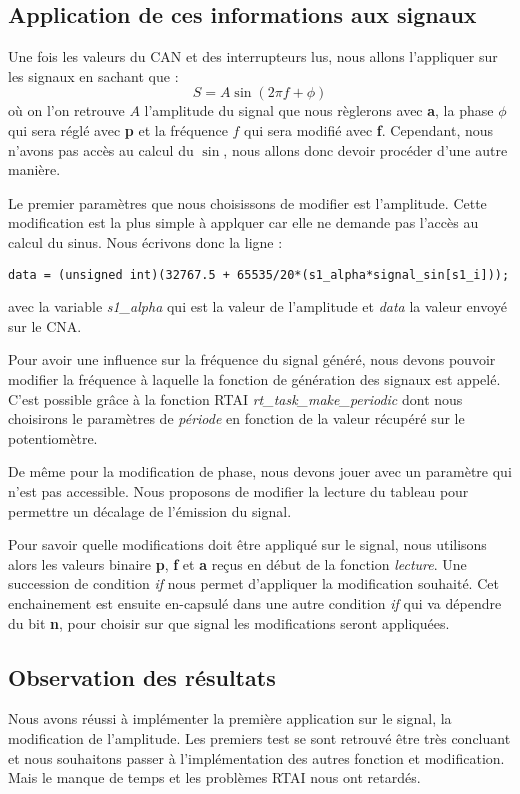 \subsection{Application de ces informations aux signaux}
Une fois les valeurs du CAN et des interrupteurs lus, nous allons l'appliquer sur les signaux en sachant que :
\begin{equation}
S = A\sin(2\pi f + \phi)
\end{equation}
où on l'on retrouve $A$ l'amplitude du signal que nous règlerons avec \textbf{a}, la phase $\phi$ qui sera réglé avec \textbf{p} et la fréquence $f$ qui sera modifié avec \textbf{f}. Cependant, nous n'avons pas accès au calcul du $\sin$, nous allons donc devoir procéder d'une autre manière.

Le premier paramètres que nous choisissons de modifier est l'amplitude. Cette modification est la plus simple à applquer car elle ne demande pas l'accès au calcul du sinus. Nous écrivons donc la ligne :
\begin{lstlisting}[style = customc]
data = (unsigned int)(32767.5 + 65535/20*(s1_alpha*signal_sin[s1_i]));
\end{lstlisting}
avec la variable \emph{s1\_alpha} qui est la valeur de l'amplitude et \emph{data} la valeur envoyé sur le CNA.

Pour avoir une influence sur la fréquence du signal généré, nous devons pouvoir modifier la fréquence à laquelle la fonction de génération des signaux est appelé. C'est possible grâce à la fonction RTAI \emph{rt\_task\_make\_periodic} dont nous choisirons le paramètres de \emph{période} en fonction de la valeur récupéré sur le potentiomètre.

De même pour la modification de phase, nous devons jouer avec un paramètre qui n'est pas accessible. Nous proposons de modifier la lecture du tableau pour permettre un décalage de l'émission du signal.

Pour savoir quelle modifications doit être appliqué sur le signal, nous utilisons alors les valeurs binaire \textbf{p}, \textbf{f} et \textbf{a} reçus en début de la fonction \emph{lecture}. Une succession de condition \emph{if} nous permet d'appliquer la modification souhaité. Cet enchainement est ensuite en-capsulé dans une autre condition \emph{if} qui va dépendre du bit \textbf{n}, pour choisir sur que signal les modifications seront appliquées. 
\subsection{Observation des résultats}
Nous avons réussi à implémenter la première application sur le signal, la modification de l'amplitude. Les premiers test se sont retrouvé être très concluant et nous souhaitons passer à l'implémentation des autres fonction et modification. Mais le manque de temps et les problèmes RTAI nous ont retardés.

